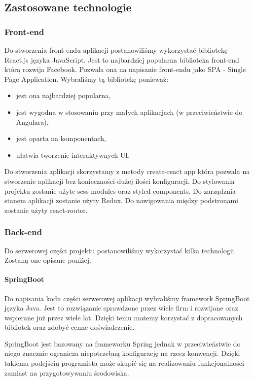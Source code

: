 \documentclass[10pt, titlepage, oneside, a4paper]{article}
\begin{document}
	\subsection{Zastosowane technologie}

	\subsubsection{Front-end}
	Do stworzenia front-endu aplikacji postanowiliśmy wykorzystać bibliotekę React.js języka JavaScript. Jest to najbardziej popularna biblioteka front-end którą rozwija Facebook. Pozwala ona na napisanie front-endu jako SPA - Single Page Application. Wybraliśmy tą bibliotekę ponieważ:
	\begin{itemize}
	\item jest ona najbardziej popularna,
	\item jest wygodna w stosowaniu przy małych aplikacjach (w przeciwieństwie do Angulara),
	\item jest oparta na komponentach,
	\item ułatwia tworzenie interaktywnych UI.
	\end{itemize}
	
	Do stworzenia aplikacji skorzystamy z metody create-react app która pozwala na stworzenie aplikacji bez konieczności dużej ilości konfiguracji. Do stylowania projektu zostanie użyte scss modules oraz styled components. Do zarządznia stanem aplikacji zostanie użyty Redux. Do nawigowania między podstronami zostanie użyty react-router.
	
	\subsubsection{Back-end}	
	Do serwerowej części projektu postanowiliśmy wykorzystać kilka technologii. Zostaną one opisane poniżej.
	
	\paragraph{SpringBoot} \mbox{} \par
	Do napisania kodu części serwerowej aplikacji wybraliśmy framework SpringBoot języka Java.
	Jest to rozwiązanie sprawdzone przez wiele firm i rozwijane oraz wspierane już przez wiele lat. Dzięki temu możemy korzystać z dopracowanych bibliotek oraz zdobyć cenne doświadczenie.

	SpringBoot jest bazowany na frameworku Spring jednak w przeciwieństwie do niego znacznie ogranicza niepotrzebną konfigurację na rzecz konwencji.
	Dzięki takiemu podejściu programista może skupić się na realizowaniu funkcjonalności zamiast na przygotowywaniu środowiska.
\end{document}
